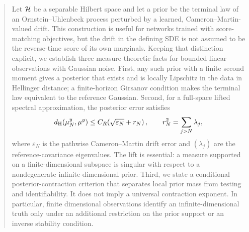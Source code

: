 \begin{abstract}
Let $\HH$ be a separable Hilbert space and let a prior be the terminal
law of an Ornstein--Uhlenbeck process perturbed by a learned,
Cameron--Martin-valued drift.  This construction is useful for networks
trained with score-matching objectives, but the drift in the defining
SDE is not assumed to be the reverse-time score of its own marginals.
Keeping that distinction explicit, we establish three measure-theoretic
facts for bounded linear observations with Gaussian noise.  First, any
such prior with a finite second moment gives a posterior that exists and
is locally Lipschitz in the data in Hellinger distance; a finite-horizon
Girsanov condition makes the terminal law equivalent to the reference
Gaussian.  Second, for a full-space lifted spectral
approximation, the posterior error satisfies
\[
  \dH(\muyN,\muy)
  \leq C_R\!\left(\sqrt{\varepsilon_N}+r_N\right),
  \qquad
  r_N^2=\sum_{j>N}\lambda_j ,
\]
where $\varepsilon_N$ is the pathwise Cameron--Martin drift error and
$(\lambda_j)$ are the reference-covariance eigenvalues.  The lift is
essential: a measure supported on a finite-dimensional subspace is
singular with respect to a nondegenerate infinite-dimensional prior.
Third, we state a conditional posterior-contraction criterion that
separates local prior mass from testing and identifiability.  It does
not imply a universal contraction exponent.  In particular, finite
dimensional observations identify an infinite-dimensional truth only
under an additional restriction on the prior support or an inverse
stability condition.
\end{abstract}
